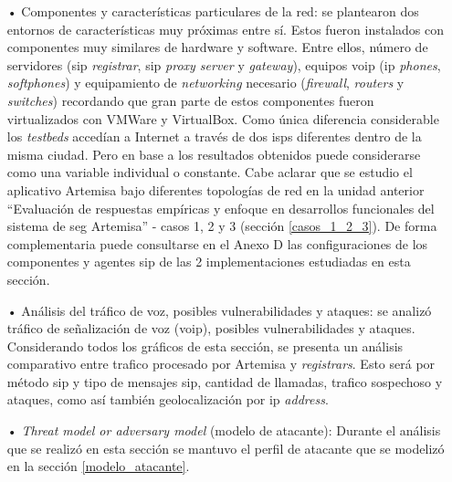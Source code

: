 \documentclass[a4paper,12pt]{report}
\begin{document}
\begin{itemize}
\item [•] Componentes y características particulares de la red:
se plantearon dos entornos de características muy próximas entre sí. Estos fueron instalados
con componentes muy similares de hardware y software. Entre ellos, número de
servidores (\ac{sip} \emph{registrar}, \ac{sip} \emph{proxy server} y \emph{gateway}),
equipos \ac{voip} (\ac{ip} \emph{phones}, \emph{softphones}) 
y equipamiento de \emph{networking} necesario (\emph{firewall}, \emph{routers} y
\emph{switches}) recordando que gran parte de estos componentes fueron virtualizados
con VMWare y VirtualBox. Como única diferencia considerable los \emph{testbeds}
accedían a Internet a través de dos \ac{isp}s diferentes
dentro de la misma ciudad. Pero en base a los resultados obtenidos
puede considerarse como una variable individual o constante. 
Cabe aclarar que se estudio el aplicativo Artemisa bajo diferentes
topologías de red en la unidad anterior ``Evaluación de respuestas empíricas
y enfoque en desarrollos funcionales del sistema de seg Artemisa'' - casos 1, 2 y 3
(sección \ref{casos_1_2_3}). De forma complementaria puede consultarse en el Anexo D
las configuraciones de los componentes y agentes \ac{sip} de las 2 implementaciones estudiadas
en esta sección.

\item [•] Análisis del tráfico de voz, posibles vulnerabilidades y
ataques: se analizó tráfico de señalización de voz (\ac{voip}), posibles
vulnerabilidades y ataques. Considerando todos los gráficos de esta sección, se presenta un
análisis comparativo entre trafico procesado por Artemisa
y \emph{registrars}. Esto será por método \ac{sip} y tipo de mensajes \ac{sip}, cantidad de llamadas,
trafico sospechoso y ataques, como así también geolocalización por \ac{ip} \emph{address}. 



\item [•] \emph{Threat model or adversary model} (modelo de atacante): Durante el análisis que se
realizó en esta sección se mantuvo el perfil de atacante que se modelizó en 
la sección \ref{modelo_atacante}.
\end{itemize}
\end{document}
